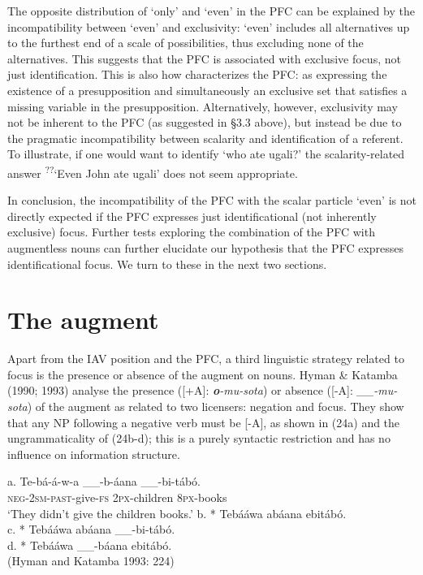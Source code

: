 \documentclass[output=paper]{langsci/langscibook}
\begin{document}
The opposite distribution of ‘only’ and ‘even’ in the PFC can be explained by the incompatibility between ‘even’ and exclusivity: ‘even’ includes all alternatives up to the furthest end of a scale of possibilities, thus excluding none of the alternatives. This suggests that the PFC is associated with exclusive focus, not just identification. This is also how \citet[52]{Walusimbi1996} characterizes the PFC: as expressing the existence of a presupposition and simultaneously an exclusive set that satisfies a missing variable in the presupposition. Alternatively, however, exclusivity may not be inherent to the PFC (as suggested in §3.3 above), but instead be due to the pragmatic incompatibility between scalarity and identification of a referent. To illustrate, if one would want to identify ‘who ate ugali?’ the scalarity-related answer \textsuperscript{??}‘Even John ate ugali’ does not seem appropriate.

  In conclusion, the incompatibility of the PFC with the scalar particle ‘even’ is not directly expected if the PFC expresses just identificational (not inherently exclusive) focus. Further tests exploring the combination of the PFC with augmentless nouns can further elucidate our hypothesis that the PFC expresses identificational focus. We turn to these in the next two sections.

\section{The augment}

Apart from the IAV position and the PFC, a third linguistic strategy related to focus is the presence or absence of the augment on nouns. Hyman \& Katamba (1990; 1993) analyse the presence ([+A]: \textbf{\textit{o}}\textit{{}-mu-sota}) or absence ([-A]: \textit{\_\_-mu-sota}) of the augment as related to two licensers: negation and focus. They show that any NP following a negative verb must be [-A], as shown in (24a) and the ungrammaticality of (24b-d); this is a purely syntactic restriction and has no influence on information structure.

\ea
\ea
\gll a.  Te-bá-á-w-a      \_\_-b-áana    \_\_-bi-tábó.\\
       \textsc{neg}{}-\textsc{2sm}{}-\textsc{past}{}-give-\textsc{fs}       \textsc{2px}{}-children       \textsc{8px}{}-books\\
\glt   ‘They didn't give the children books.’
\ex b.  * Tebááwa abáana ebitábó.\\
\ex c.  * Tebááwa abáana \_\_-bi-tábó.\\
\ex d.  * Tebááwa \_\_-báana ebitábó. \\
\glt (Hyman and Katamba 1993: 224)
\z
\z
\end{document}
